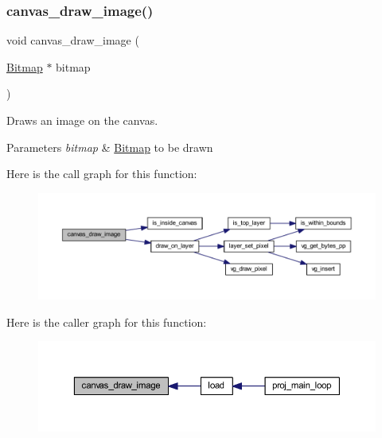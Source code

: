 \subsubsection{\texorpdfstring{canvas\+\_\+draw\+\_\+image()}{canvas\_draw\_image()}}
{\footnotesize\ttfamily void canvas\+\_\+draw\+\_\+image (\begin{DoxyParamCaption}\item[{\mbox{\hyperlink{struct_bitmap}{Bitmap}} $\ast$}]{bitmap }\end{DoxyParamCaption})}



Draws an image on the canvas. 


\begin{DoxyParams}{Parameters}
{\em bitmap} & \mbox{\hyperlink{struct_bitmap}{Bitmap}} to be drawn \\
\hline
\end{DoxyParams}
Here is the call graph for this function\+:\nopagebreak
\begin{figure}[H]
\begin{center}
\leavevmode
\includegraphics[width=350pt]{group__canvas_ga303719676550209a9abd9ca6554632ae_cgraph}
\end{center}
\end{figure}
Here is the caller graph for this function\+:\nopagebreak
\begin{figure}[H]
\begin{center}
\leavevmode
\includegraphics[width=350pt]{group__canvas_ga303719676550209a9abd9ca6554632ae_icgraph}
\end{center}
\end{figure}
\mbox{\label{group__canvas_ga6467ff4e7b1752b7d5e59664a16d3319}} 
